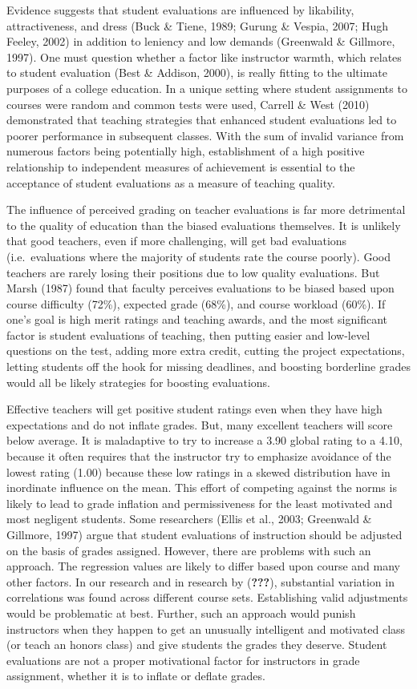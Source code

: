 \documentclass[,man]{apa6}
\theoremstyle{definition}
\theoremstyle{definition}
\theoremstyle{definition}
\theoremstyle{remark}
\begin{document}
Evidence suggests that student evaluations are influenced by likability,
attractiveness, and dress (Buck \& Tiene, 1989; Gurung \& Vespia, 2007;
Hugh Feeley, 2002) in addition to leniency and low demands (Greenwald \&
Gillmore, 1997). One must question whether a factor like instructor
warmth, which relates to student evaluation (Best \& Addison, 2000), is
really fitting to the ultimate purposes of a college education. In a
unique setting where student assignments to courses were random and
common tests were used, Carrell \& West (2010) demonstrated that
teaching strategies that enhanced student evaluations led to poorer
performance in subsequent classes. With the sum of invalid variance from
numerous factors being potentially high, establishment of a high
positive relationship to independent measures of achievement is
essential to the acceptance of student evaluations as a measure of
teaching quality.

The influence of perceived grading on teacher evaluations is far more
detrimental to the quality of education than the biased evaluations
themselves. It is unlikely that good teachers, even if more challenging,
will get bad evaluations (i.e.~evaluations where the majority of
students rate the course poorly). Good teachers are rarely losing their
positions due to low quality evaluations. But Marsh (1987) found that
faculty perceives evaluations to be biased based upon course difficulty
(72\%), expected grade (68\%), and course workload (60\%). If one's goal
is high merit ratings and teaching awards, and the most significant
factor is student evaluations of teaching, then putting easier and
low-level questions on the test, adding more extra credit, cutting the
project expectations, letting students off the hook for missing
deadlines, and boosting borderline grades would all be likely strategies
for boosting evaluations.

Effective teachers will get positive student ratings even when they have
high expectations and do not inflate grades. But, many excellent
teachers will score below average. It is maladaptive to try to increase
a 3.90 global rating to a 4.10, because it often requires that the
instructor try to emphasize avoidance of the lowest rating (1.00)
because these low ratings in a skewed distribution have in inordinate
influence on the mean. This effort of competing against the norms is
likely to lead to grade inflation and permissiveness for the least
motivated and most negligent students. Some researchers (Ellis et al.,
2003; Greenwald \& Gillmore, 1997) argue that student evaluations of
instruction should be adjusted on the basis of grades assigned. However,
there are problems with such an approach. The regression values are
likely to differ based upon course and many other factors. In our
research and in research by ({\textbf{???}}), substantial variation in
correlations was found across different course sets. Establishing valid
adjustments would be problematic at best. Further, such an approach
would punish instructors when they happen to get an unusually
intelligent and motivated class (or teach an honors class) and give
students the grades they deserve. Student evaluations are not a proper
motivational factor for instructors in grade assignment, whether it is
to inflate or deflate grades.
\end{document}
